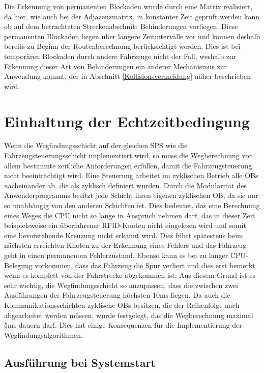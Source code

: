 			Die Erkennung von permanenten Blockaden wurde durch eine Matrix realisiert, da hier, wie auch bei der Adjazenzmatrix, in konstanter Zeit geprüft werden kann ob auf dem betrachteten Streckenabschnitt Behinderungen vorliegen. Diese permanenten Blockaden liegen über längere Zeitintervalle vor und können deshalb bereits zu Beginn der Routenberechnung berücksichtigt werden. Dies ist bei temporären Blockaden durch andere Fahrzeuge nicht der Fall, weshalb zur Erkennung dieser Art von Behinderungen ein anderer Mechanismus zur Anwendung kommt, der in Abschnitt \ref{Kollisionsvermeidung} näher beschrieben wird.
			
			
	\section{Einhaltung der Echtzeitbedingung}
		
		Wenn die Wegfindungsschicht auf der gleichen \ac{SPS} wie die Fahrzeugsteuerungsschicht implementiert wird, so muss die Wegberechnung vor allem bestimmte zeitliche Anforderungen erfüllen, damit die Fahrzeugsteuerung nicht beeinträchtigt wird. Eine Steuerung arbeitet im zyklischen Betrieb alle \ac{OB}s nacheinander ab, die als zyklisch definiert wurden. Durch die Modularität des Anwenderprogramms besitzt jede Schicht ihren eigenen zyklischen \ac{OB}, da sie nur so unabhängig von den anderen Schichten ist.  Dies bedeutet, das eine Berechnung eines Weges die CPU nicht so lange in Anspruch nehmen darf, das in dieser Zeit beispielsweise ein überfahrener RFID-Knoten nicht eingelesen wird und somit eine  bevorstehende Kreuzung nicht erkannt wird. Dies führt spätestens beim nächsten erreichten Knoten zu der Erkennung eines Fehlers und das Fahrzeug geht in einen permanenten Fehlerzustand. Ebenso kann es bei zu langer CPU-Belegung vorkommen, dass das Fahrzeug die Spur verliert und dies erst bemerkt wenn es komplett von der Fahrstrecke abgekommen ist. Aus diesem Grund ist es sehr wichtig, die Wegfindungsschicht so anzupassen, dass die zwischen zwei Ausführungen der Fahrzeugsteuerung höchsten 10ms liegen. Da auch die Kommunikationsschichten zyklische \ac{OB}s besitzen, die der Reihenfolge nach abgearbeitet werden müssen, wurde festgelegt, das die Wegberechnung maximal 5ms dauern darf. Dies hat einige Konsequenzen für die Implementierung der Wegfindungsalgorithmen.
		
	
		\subsection{Ausführung bei Systemstart}
			
